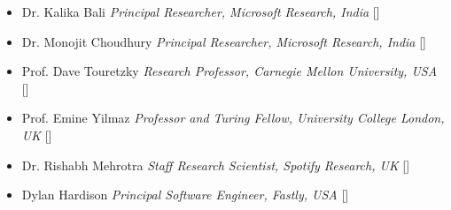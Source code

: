 
\begin{referees}
\course
	{\begin{itemize}
	
	\item {Dr. Kalika Bali} \dotfill \emph{Principal Researcher, Microsoft Research, India}  [\href{https://www.microsoft.com/en-us/research/people/kalikab/}{\small{\websiteSymbol}}]
	
	\item {Dr. Monojit Choudhury} \dotfill \emph{Principal Researcher, Microsoft Research, India} [\href{https://www.microsoft.com/en-us/research/people/monojitc/}{\small{\websiteSymbol}}]
	
	\item {Prof. Dave Touretzky} \dotfill \emph{Research Professor, Carnegie Mellon University, USA} [\href{https://www.cs.cmu.edu/~dst/}{\small{\websiteSymbol}}]
	
	\item {Prof. Emine Yilmaz}  \dotfill \emph{Professor and Turing Fellow, University College London, UK} [\href{https://sites.google.com/site/emineyilmaz/}{\small{\websiteSymbol}}]
	
	\item {Dr. Rishabh Mehrotra} \dotfill \emph{Staff Research Scientist, Spotify Research, UK} [\href{http://rishabhmehrotra.com/}{\small{\websiteSymbol}}]
    
    \item {Dylan Hardison} \dotfill \emph{Principal Software Engineer, Fastly, USA} [\href{https://www.linkedin.com/in/dylanwh/}{\small{\websiteSymbol}}]
    
     \end{itemize}}
     
\end{referees}
